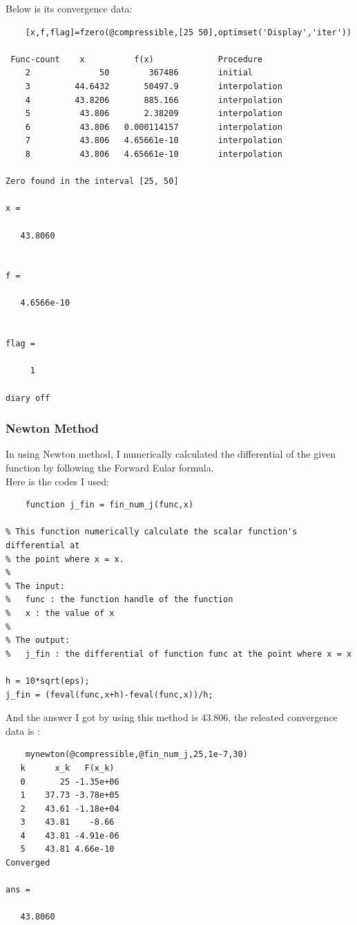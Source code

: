 \documentclass[11pt]{article}
\begin{document}
    Below is its convergence data:
    \begin{verbatim}
    [x,f,flag]=fzero(@compressible,[25 50],optimset('Display','iter'))
 
 Func-count    x          f(x)             Procedure
    2              50        367486        initial
    3         44.6432       50497.9        interpolation
    4         43.8206       885.166        interpolation
    5          43.806       2.38209        interpolation
    6          43.806   0.000114157        interpolation
    7          43.806   4.65661e-10        interpolation
    8          43.806   4.65661e-10        interpolation
 
Zero found in the interval [25, 50]

x =

   43.8060


f =

   4.6566e-10


flag =

     1

diary off
    \end{verbatim}

\subsubsection{Newton Method}
    
    In using Newton method, I numerically calculated the differential of the given function by following the Forward Eular formula.\\
    
    Here is the codes I used:
    \begin{verbatim}
    function j_fin = fin_num_j(func,x)

% This function numerically calculate the scalar function's differential at
% the point where x = x.
%
% The input:
%   func : the function handle of the function
%   x : the value of x
%
% The output:
%   j_fin : the differential of function func at the point where x = x

h = 10*sqrt(eps);
j_fin = (feval(func,x+h)-feval(func,x))/h;

    \end{verbatim}
    
    And the answer I got by using this method is 43.806, the releated convergence data is :
    \begin{verbatim}
    mynewton(@compressible,@fin_num_j,25,1e-7,30)
   k      x_k   F(x_k)
   0       25 -1.35e+06
   1    37.73 -3.78e+05
   2    43.61 -1.18e+04
   3    43.81    -8.66
   4    43.81 -4.91e-06
   5    43.81 4.66e-10
Converged

ans =

   43.8060
\end{verbatim}
\end{document}
